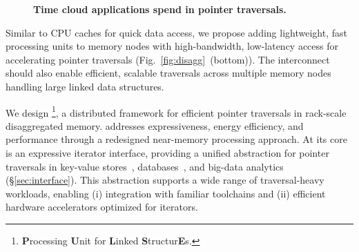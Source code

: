 \begin{figure}[ht!]
    \centering
    \caption[Time cloud applications spend in pointer traversals.]{\textbf{Time cloud applications spend in pointer traversals.}} 
    \label{fig:motivation}
\end{figure}

Similar to CPU caches for quick data access, we propose adding lightweight, fast processing units to memory nodes with high-bandwidth, low-latency access for accelerating pointer traversals (Fig.~\ref{fig:disagg}~(bottom)). The interconnect should also enable efficient, scalable traversals across multiple memory nodes handling large linked data structures. 



We design \pulse\footnote{\textbf{P}rocessing \textbf{U}nit for \textbf{L}inked \textbf{S}tructur\textbf{E}s.}, a distributed framework for efficient pointer traversals in rack-scale disaggregated memory. \pulse addresses expressiveness, energy efficiency, and performance through a redesigned near-memory processing approach. At its core is an expressive iterator interface, providing a unified abstraction for pointer traversals in key-value stores~\cite{redis, memcached}, databases~\cite{wiredtiger, btree1, btree2, trie1, trie3}, and big-data analytics~\cite{powergraph, graphx, graphchi, pagerank} (\S\ref{sec:interface}). This abstraction supports a wide range of traversal-heavy workloads, enabling (i) integration with familiar toolchains and (ii) efficient hardware accelerators optimized for iterators.

